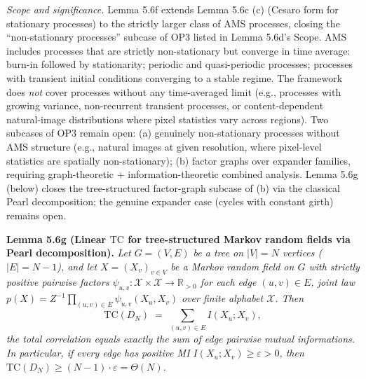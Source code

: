\documentclass[
]{article}
\begin{document}
\emph{Scope and significance.} Lemma 5.6f extends Lemma 5.6c (c)
(Cesaro form for stationary processes) to the strictly larger class
of AMS processes, closing the ``non-stationary processes'' subcase
of OP3 listed in Lemma 5.6d's Scope. AMS includes processes that
are strictly non-stationary but converge in time average: burn-in
followed by stationarity; periodic and quasi-periodic processes;
processes with transient initial conditions converging to a stable
regime. The framework does \emph{not} cover processes without any
time-averaged limit (e.g., processes with growing variance,
non-recurrent transient processes, or content-dependent natural-image
distributions where pixel statistics vary across regions). Two
subcases of OP3 remain open: (a) genuinely non-stationary processes
without AMS structure (e.g., natural images at given resolution,
where pixel-level statistics are spatially non-stationary);
(b) factor graphs over expander families, requiring graph-theoretic
+ information-theoretic combined analysis. Lemma 5.6g (below) closes
the tree-structured factor-graph subcase of (b) via the classical
Pearl decomposition; the genuine expander case (cycles with constant
girth) remains open.

\textbf{Lemma 5.6g (Linear $\mathrm{TC}$ for tree-structured Markov
random fields via Pearl decomposition).}
\emph{Let $G = (V, E)$ be a tree on $|V| = N$ vertices ($|E| = N - 1$),
and let $X = (X_v)_{v \in V}$ be a Markov random field on $G$ with
strictly positive pairwise factors $\psi_{u, v} : \mathcal{X} \times
\mathcal{X} \to \mathbb{R}_{>0}$ for each edge $(u, v) \in E$, joint
law $p(X) = Z^{-1} \prod_{(u, v) \in E} \psi_{u, v}(X_u, X_v)$ over
finite alphabet $\mathcal{X}$. Then}
\[
\mathrm{TC}(D_N) \;=\; \sum_{(u, v) \in E} I(X_u; X_v),
\]
\emph{the total correlation equals exactly the sum of edge pairwise
mutual informations. In particular, if every edge has positive MI
$I(X_u; X_v) \geq \varepsilon > 0$, then
$\mathrm{TC}(D_N) \geq (N-1) \cdot \varepsilon = \Theta(N)$.}
\end{document}
